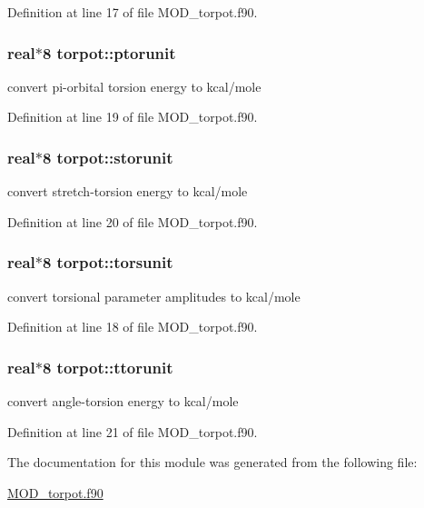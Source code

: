 Definition at line 17 of file M\-O\-D\-\_\-torpot.\-f90.

\hypertarget{classtorpot_a3423a55797683f42ce3eb09a8e936fc6}{
\subsubsection[{ptorunit}]{\setlength{\rightskip}{0pt plus 5cm}real$\ast$8 torpot\-::ptorunit}}\label{classtorpot_a3423a55797683f42ce3eb09a8e936fc6}


convert pi-\/orbital torsion energy to kcal/mole 



Definition at line 19 of file M\-O\-D\-\_\-torpot.\-f90.

\hypertarget{classtorpot_af896106db7360f2c4d737174dc6baf3e}{
\subsubsection[{storunit}]{\setlength{\rightskip}{0pt plus 5cm}real$\ast$8 torpot\-::storunit}}\label{classtorpot_af896106db7360f2c4d737174dc6baf3e}


convert stretch-\/torsion energy to kcal/mole 



Definition at line 20 of file M\-O\-D\-\_\-torpot.\-f90.

\hypertarget{classtorpot_a96c1dd193b438c4c00102f314a7951e5}{
\subsubsection[{torsunit}]{\setlength{\rightskip}{0pt plus 5cm}real$\ast$8 torpot\-::torsunit}}\label{classtorpot_a96c1dd193b438c4c00102f314a7951e5}


convert torsional parameter amplitudes to kcal/mole 



Definition at line 18 of file M\-O\-D\-\_\-torpot.\-f90.

\hypertarget{classtorpot_aa8885ebf7c821b9060064e99a5f95f8a}{
\subsubsection[{ttorunit}]{\setlength{\rightskip}{0pt plus 5cm}real$\ast$8 torpot\-::ttorunit}}\label{classtorpot_aa8885ebf7c821b9060064e99a5f95f8a}


convert angle-\/torsion energy to kcal/mole 



Definition at line 21 of file M\-O\-D\-\_\-torpot.\-f90.



The documentation for this module was generated from the following file\-:\begin{DoxyCompactItemize}
\item 
\hyperlink{MOD__torpot_8f90}{M\-O\-D\-\_\-torpot.\-f90}\end{DoxyCompactItemize}
